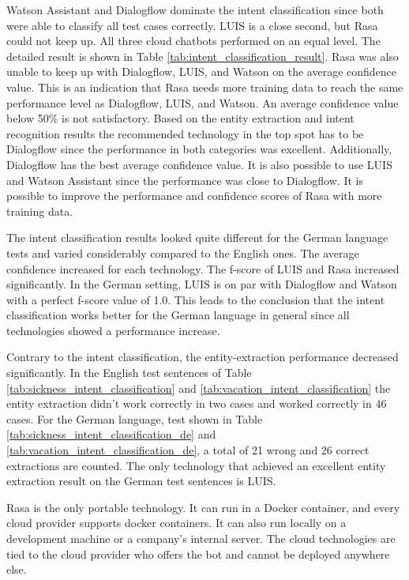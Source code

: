 Watson Assistant and Dialogflow dominate the intent classification since both were able to classify all test cases correctly.
LUIS is a close second, but Rasa could not keep up.
All three cloud chatbots performed on an equal level.
The detailed result is shown in Table \ref{tab:intent_classification_result}.
Rasa was also unable to keep up with Dialogflow, LUIS, and Watson on the average confidence value.
This is an indication that Rasa needs more training data to 
reach the same performance level as Dialogflow, LUIS, and Watson.
An average confidence value below 50\% is not satisfactory.
Based on the entity extraction and intent recognition results
the recommended technology in the top spot has to be Dialogflow since the performance in both categories was excellent.
Additionally, Dialogflow has the best average confidence value.
It is also possible to use LUIS and Watson Assistant since the performance was close to Dialogflow.
It is possible to improve the performance and confidence scores of Rasa with more training data.

The intent classification results looked quite different for the German language tests and varied considerably compared to the English ones.
The average confidence increased for each technology.
The f-score of LUIS and Rasa increased significantly. 
In the German setting, LUIS is on par with Dialogflow and Watson with a perfect f-score value of 1.0.
This leads to the conclusion that the intent classification works better for the German language in general since all technologies showed a performance increase.

Contrary to the intent classification, the entity-extraction performance decreased significantly.
In the English test sentences of Table \ref{tab:sickness_intent_classification} and \ref{tab:vacation_intent_classification} the entity extraction didn't work correctly in two cases and worked correctly in 46 cases.
For the German language, test shown in Table \ref{tab:sickness_intent_classification_de} and \ref{tab:vacation_intent_classification_de}, a total of 21 wrong and 26 correct extractions are counted.
The only technology that achieved an excellent entity extraction result on the German test sentences is LUIS.

Rasa is the only portable technology.
It can run in a Docker container, and every cloud provider supports docker containers.
It can also run locally on a development machine or a company's internal server.
The cloud technologies are tied to the cloud provider who offers the bot and cannot be deployed anywhere else.

